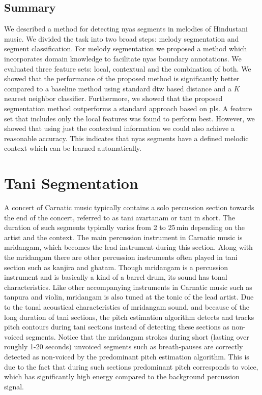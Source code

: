 {\subsection{Summary}
\label{ConclusionAndFutureWork}

We described a method for detecting \gls{nyas} segments in melodies of Hindustani music. We divided the task into two broad steps: melody segmentation and segment classification. For melody segmentation we proposed a method which incorporates domain knowledge to facilitate \gls{nyas} boundary annotations. We evaluated three feature sets: local, contextual and the combination of both. We showed that the performance of the proposed method is significantly better compared to a baseline method using standard \gls{dtw} based distance and a $K$ nearest neighbor classifier. Furthermore, we showed that the proposed segmentation method outperforms a standard approach based on \gls{pls}. A feature set that includes only the local features was found to perform best. However, we showed that using just the contextual information we could also achieve a reasonable accuracy. This indicates that \gls{nyas} segments have a defined melodic context which can be learned automatically. 


\section{Tani Segmentation}
\label{sec:pre_processing_tani_segmentation}

A concert of Carnatic music typically contains a solo percussion section towards the end of the concert, referred to as \gls{tani} avartanam or \gls{tani} in short. The duration of such segments typically varies from 2 to 25\,min depending on the artist and the context. The main percussion instrument in Carnatic music is \gls{mridangam}, which becomes the lead instrument during this section. Along with the \gls{mridangam} there are other percussion instruments often played in \gls{tani} section such as \gls{kanjira} and \gls{ghatam}. Though \gls{mridangam} is a percussion instrument and is basically a kind of a barrel drum, its sound has tonal characteristics. Like other accompanying instruments in Carnatic music such as \gls{tanpura} and violin, \Gls{mridangam} is also tuned at the tonic of the lead artist. Due to the tonal acoustical characteristics of \gls{mridangam} sound, and because of the long duration of \gls{tani} sections, the pitch estimation algorithm detects and tracks pitch contours during \gls{tani} sections instead of detecting these sections as non-voiced segments. Notice that the \gls{mridangam} strokes during short (lasting over roughly 1-20 seconds) unvoiced segments such as breath-pauses are correctly detected as non-voiced by the predominant pitch estimation algorithm. This is due to the fact that during such sections predominant pitch corresponds to voice, which has significantly high energy compared to the background percussion signal. 


}

